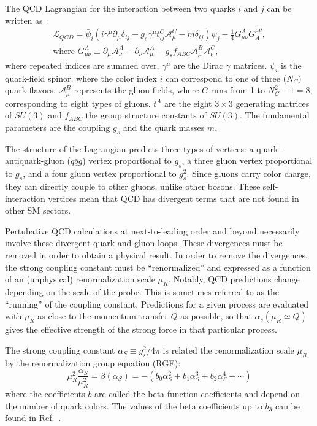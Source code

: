 The QCD Lagrangian for the interaction between two quarks $i$ and $j$ can be written as~\cite{PDG}:
\begin{eqnarray}
\mathcal{L}_{QCD} = \bar{\psi}_i(i\gamma^{\mu}\partial_{\mu}\delta_{ij} - g_s\gamma^\mu t^C_{ij}\mathcal{A}^C_\mu -m\delta_{ij})\psi_j -\frac{1}{4}G^{A}_{\mu\nu}G^{\mu\nu}_A,\\
\mbox{where } G^A_{\mu\nu} \equiv \partial_\mu \mathcal{A}^A_{\nu}-\partial_\nu \mathcal{A}^A_{\mu} - g_s f_{ABC} \mathcal{A}^B_{\mu} \mathcal{A}^C_{\nu},
\end{eqnarray}
where repeated indices are summed over, $\gamma^{\mu}$ are the Dirac $\gamma$ matrices. ${\psi}_i$ is the quark-field spinor, where the color index $i$ can correspond to one of three ($N_C$) quark flavors. $\mathcal{A}^{B}_{\mu}$ represents the gluon fields, where $C$ runs from 1 to $N_C^2-1=8$, corresponding to eight types of gluons. $t^{A}$ are the eight $3 \times 3$ generating matrices of $SU(3)$ and $f_{ABC}$ the group structure constants of $SU(3)$. The fundamental parameters are the coupling $g_s$ and the quark masses $m$.

The structure of the Lagrangian predicts three types of vertices: a quark-antiquark-gluon ($q\bar{q}g$) vertex proportional to $g_s$, a three gluon vertex  proportional to $g_s$, and a four gluon vertex proportional to $g_s^2$. Since gluons carry color charge, they can directly couple to other gluons, unlike other bosons. These self-interaction vertices mean that QCD has divergent terms that are not found in other SM sectors. 

Pertubative QCD calculations at next-to-leading order and beyond necessarily involve these divergent quark and gluon loops. These divergences must be removed in order to obtain a physical result. In order to remove the divergences, the strong coupling constant must be ``renormalized'' and expressed as a function of an (unphysical) renormalization scale $\mu_R$. Notably, QCD predictions change depending on the scale of the probe. This is sometimes referred to as the ``running'' of the coupling constant. Predictions for a given process are evaluated with $\mu_R$ as close to the momentum transfer $Q$ as possible, so that $\alpha_s(\mu_R \simeq Q)$ gives the effective strength of the strong force in that particular process. 

The strong coupling constant $\alpha_S \equiv g_s^2/4\pi$ is related the renormalization scale $\mu_R$ by the renormalization group equation (RGE):
\begin{equation}
\mu_R^2 \frac{\alpha_S}{\mu^2_R} = \beta \left( \alpha_S \right) = -\left( b_0\alpha^2_S + b_1\alpha^3_S + b_2\alpha^4_S + \dotsb \right)
\label{eq:rge}
\end{equation}
where the coefficients $b$ are called the beta-function coefficients and depend on the number of quark colors. The values of the beta coefficients up to $b_3$ can be found in Ref.~\cite{vanRitbergen:1997va}. 

